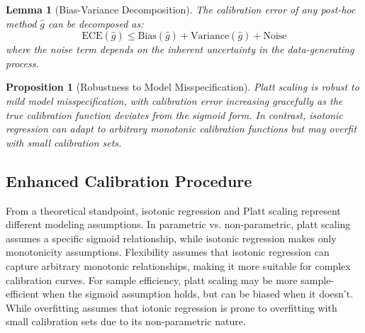 \documentclass[12pt, a4paper]{article}
\newtheorem{lemma}{Lemma}
\newtheorem{proposition}{Proposition}
\begin{document}
\begin{lemma}[Bias-Variance Decomposition]
The calibration error of any post-hoc method $\hat{g}$ can be decomposed as:
\begin{equation}
\text{ECE}(\hat{g}) \leq \text{Bias}(\hat{g}) + \text{Variance}(\hat{g}) + \text{Noise}
\end{equation}
where the noise term depends on the inherent uncertainty in the data-generating process.
\end{lemma}

\begin{proposition}[Robustness to Model Misspecification]
Platt scaling is robust to mild model misspecification, with calibration error increasing gracefully as the true calibration function deviates from the sigmoid form. In contrast, isotonic regression can adapt to arbitrary monotonic calibration functions but may overfit with small calibration sets.
\end{proposition}


\subsection{Enhanced Calibration Procedure}

From a theoretical standpoint, isotonic regression and Platt scaling represent different modeling assumptions. In parametric vs. non-parametric, platt scaling assumes a specific sigmoid relationship, while isotonic regression makes only monotonicity assumptions. Flexibility assumes that isotonic regression can capture arbitrary monotonic relationships, making it more suitable for complex calibration curves. For sample efficiency, platt scaling may be more sample-efficient when the sigmoid assumption holds, but can be biased when it doesn't. While overfitting assumes that iotonic regression is prone to overfitting with small calibration sets due to its non-parametric nature.
\end{document}
